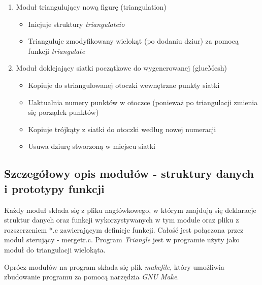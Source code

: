 \documentclass[a4paper,12pt,twoside]{article}
\begin{document}
\begin{enumerate}
\item Moduł triangulujący nową figurę (triangulation)
\begin{itemize}
\item Inicjuje struktury \textit{triangulateio}
\item Trianguluje zmodyfikowany wielokąt (po dodaniu dziur) za pomocą funkcji \textit{triangulate}
\end{itemize}

\item Moduł doklejający siatki początkowe do wygenerowanej (glueMesh)
\begin{itemize}
\item Kopiuje do striangulowanej otoczki wewnętrzne punkty siatki
\item Uaktualnia numery punktów w otoczce (ponieważ po triangulacji zmienia się porządek punktów)
\item Kopiuje trójkąty z siatki do otoczki według nowej numeracji
\item Usuwa dziurę stworzoną w miejscu siatki
\end{itemize}

\end{enumerate}

\subsection{Szczegółowy opis modułów - struktury danych i prototypy funkcji}

Każdy moduł składa się z pliku nagłówkowego, w którym znajdują się deklaracje struktur danych oraz funkcji wykorzystywanych w tym module oraz pliku z rozszerzeniem *.c zawierającym definicje funkcji. Całość jest połączona przez moduł sterujący - mergetr.c. Program \textit{Triangle} jest w programie użyty jako moduł do triangulacji wielokąta.
 
Oprócz modułów na program składa się plik \textit{makefile}, który umożliwia zbudowanie programu za pomocą narzędzia \textit{GNU Make}.
\end{document}
